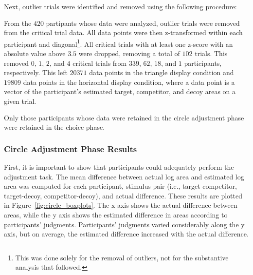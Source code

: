 Next, outlier trials were identified and removed using the following procedure:

From the $420$ partipants whose data were analyzed, outlier trials were removed from the critical trial data. All data points were then z-transformed within each participant and diagonal\footnote{This was done solely for the removal of outliers, not for the substantive analysis that followed.}. All critical trials with at least one z-score with an absolute value above $3.5$ were dropped, removing a total of $102$ trials. This removed $0$, $1$, $2$, and $4$ critical trials from $339$, $62$, $18$, and $1$ participants, respectively. This left $20371$ data points in the triangle display condition and $19809$ data points in the horizontal display condition, where a data point is a vector of the participant's estimated target, competitor, and decoy areas on a given trial. 

Only those participants whose data were retained in the circle adjustment phase were retained in the choice phase. 

\subsubsection{Circle Adjustment Phase Results}

First, it is important to show that participants could adequately perform the adjustment task. The mean difference between actual log area and estimated log area was computed for each participant, stimulus pair (i.e., target-competitor, target-decoy, competitor-decoy), and actual difference. These results are plotted in Figure~\ref{fig:circle_boxplots}. The x axis shows the actual difference between areas, while the y axis shows the estimated difference in areas according to participants' judgments. Participants' judgments varied considerably along the y axis, but on average, the estimated difference increased with the actual difference. 

